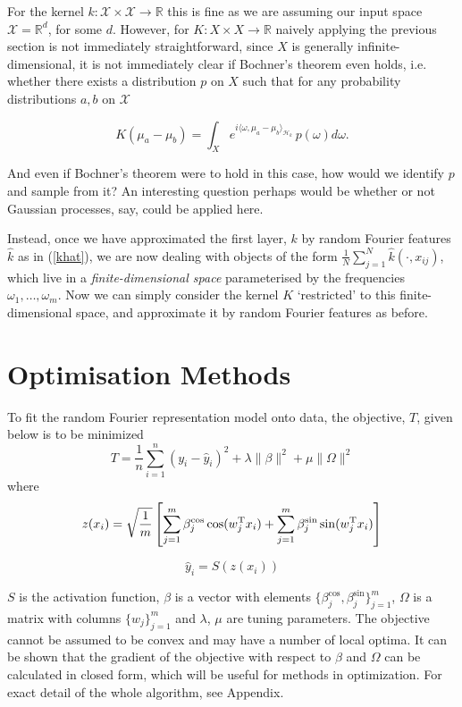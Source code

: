 \documentclass{article} %
\newcommand{\T}{^\textup{T}}
\newcommand{\vectGreek}[1]{#1}
\newcommand{\matr}[1]{#1}
\begin{document}
For the kernel $k: \mathcal{X}\times\mathcal{X}\rightarrow\mathbb{R}$ this is fine as we are assuming our input space $\mathcal{X}=\mathbb{R}^d$, for some $d$. However, for $K: X \times X\rightarrow\mathbb{R}$ naively applying the previous section is not immediately straightforward, since $X$ is generally infinite-dimensional, it is not immediately clear if Bochner's theorem even holds, i.e. whether there exists a distribution $p$ on $X$ such that for any probability distributions $a,b$ on $\mathcal{X}$

$$K(\mu_a - \mu_b)=\int_X e^{i \langle\omega ,\mu_a - \mu_b \rangle_{\mathcal{H}_k}}\, p(\omega) d\omega.$$

And even if Bochner's theorem were to hold in this case, how would we identify $p$ and sample from it? An interesting question perhaps would be whether or not Gaussian processes, say, could be applied here.

Instead, once we have approximated the first layer, $k$ by random Fourier features $\hat{k}$ as in (\ref{khat}), we are now dealing with objects of the form $\frac{1}{N} \sum_{j=1}^N \hat{k}(\cdot,x_{ij})$, which live in a \textit{finite-dimensional space} parameterised by the frequencies $\omega_1,\dots,\omega_m$. Now we can simply consider the kernel $K$ `restricted' to this finite-dimensional space, and approximate it by random Fourier features as before.

\section{Optimisation Methods }

To fit the random Fourier representation model onto data, the objective, $T$, given below is to be minimized
\begin{equation}\label{loss}
T=\frac{1}{n}\sum_{i=1}^{n}
\left(
	y_i-\hat{y}_i
\right)^2
+\lambda\|\vectGreek{\beta}\|^2
+\mu\|\matr{\Omega}\|^2
\end{equation}
where
\begin{equation} \label{transf_x}
z(x_i) = \sqrt{ \frac{1}{m}}\left[ \sum_{j=1}^{m} \beta_{j}^{\cos} \cos( w_{j}\T x_i ) + \sum_{j=1}^{m} \beta_{j}^{\sin} \sin( w_{j}\T x_i )\right]
\end{equation}

\begin{equation}\label{pred_y}
\hat{y}_i=S( z (x_{i} ))
\end{equation}

$S$ is the activation function, $\beta$ is a vector with elements $\{ \beta_{j}^{\cos}, \beta_{j}^{\sin}\}_{j=1}^{m}$, $\Omega$ is a matrix with columns $ \{ w_{j} \}_{j=1}^{m}$ and $\lambda$, $\mu$ are tuning parameters. The objective cannot be assumed to be convex and may have a number of local optima. It can be shown that the gradient of the objective with respect to $\vectGreek{\beta}$ and $\matr{\Omega}$ can be calculated in closed form, which will be useful for methods in optimization. For exact detail of the whole algorithm, see Appendix.
\end{document}
